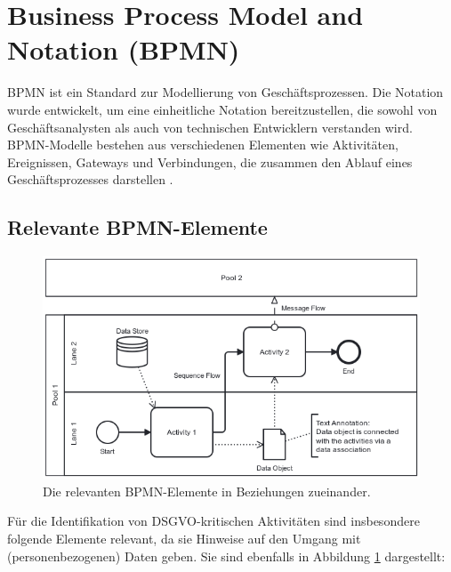 \section{Business Process Model and Notation (BPMN)}\label{sec:bpmn}

\ac{BPMN} ist ein Standard zur Modellierung von Geschäftsprozessen. Die Notation wurde entwickelt, um eine einheitliche Notation bereitzustellen, die sowohl von Geschäftsanalysten als auch von technischen Entwicklern verstanden wird. \ac{BPMN}-Modelle bestehen aus verschiedenen Elementen wie Aktivitäten, Ereignissen, Gateways und Verbindungen, die zusammen den Ablauf eines Geschäftsprozesses darstellen \cite{omgbpmn}.

\subsection*{Relevante BPMN-Elemente}

\begin{figure}
    \centering
    \includegraphics[width=.65\linewidth]{images/process-models/bpmn-elements-showcase-en}
    \caption{Die relevanten BPMN-Elemente in Beziehungen zueinander.}
    \label{fig:bpmn-elements-showcase}
\end{figure}

Für die Identifikation von \ac{DSGVO}-kritischen Aktivitäten sind insbesondere folgende Elemente relevant, da sie Hinweise auf den Umgang mit (personenbezogenen) Daten geben. Sie sind ebenfalls in Abbildung \ref{fig:bpmn-elements-showcase} dargestellt:

